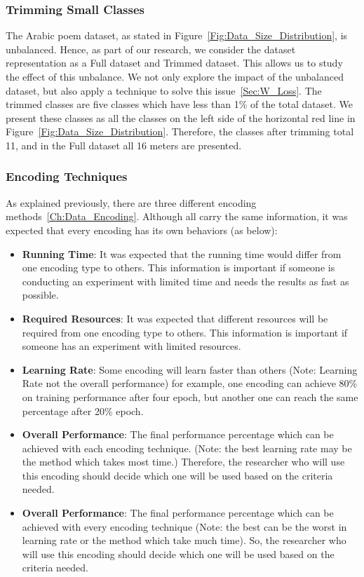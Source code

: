 \subsubsection{Trimming Small Classes}

The Arabic poem dataset, as stated in Figure~\ref{Fig:Data_Size_Distribution}, is unbalanced. Hence, as part of our research, we consider the dataset representation as a Full dataset and Trimmed dataset. This allows us to study the effect of this unbalance. We not only explore the impact of the unbalanced dataset, but also apply a technique to solve this issue~\ref{Sec:W_Loss}. The trimmed classes are five classes which have less than 1\% of the total dataset. We present these classes as all the classes on the left side of the horizontal red line in Figure~\ref{Fig:Data_Size_Distribution}. Therefore, the classes after trimming total 11, and in the Full dataset all 16 meters are presented.

\subsubsection{Encoding Techniques}

As explained previously, there are three different encoding methods~\ref{Ch:Data_Encoding}. Although all carry the same information, it was expected that every encoding has its own behaviors (as below):

\begin{itemize}
 \item \textbf{Running Time}: It was expected that the running time would differ from one encoding type to others. This information is important if someone is conducting an experiment with limited time and needs the results as fast as possible.
 \item \textbf{Required Resources}: It was expected that different resources will be required from one encoding type to others. This information is important if someone has an experiment with limited resources.
 
 \item \textbf{Learning Rate}: Some encoding will learn faster than others (Note: Learning Rate not the overall performance) for example, one encoding can achieve 80\% on training performance after four epoch, but another one can reach the same percentage after 20\% epoch.
 \item \textbf{Overall Performance}: The final performance percentage which can be achieved with each encoding technique. (Note: the best learning rate may be the method which takes most time.) Therefore, the researcher who will use this encoding should decide which one will be used based on the criteria needed.

 \item \textbf{Overall Performance}: The final performance percentage which can be achieved with every encoding technique (Note: the best can be the worst in learning rate or the method which take much time). So, the researcher who will use this encoding should decide which one will be used based on the criteria needed.

\end{itemize}

